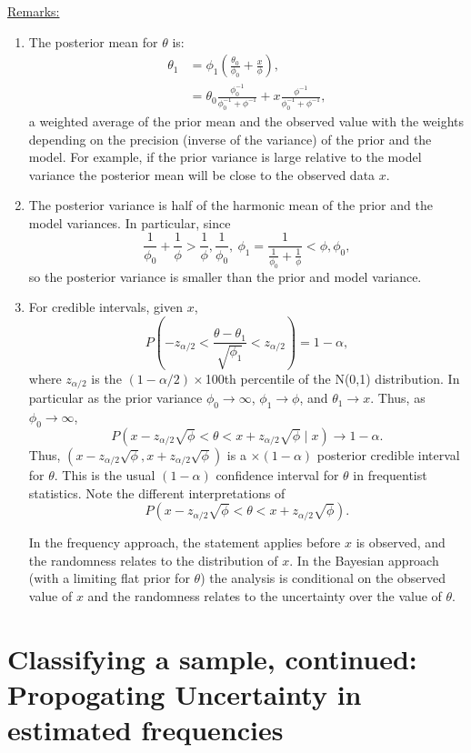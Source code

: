 \documentclass{article}[11pt]
\begin{document}
\underline{Remarks:}
\begin{enumerate}
\item The posterior mean for $\theta$ is:
\begin{align}
\theta_1 & =\phi_1 \left(\frac{\theta_0}{\phi_0} + \frac{x}{\phi}
\right), \\
&=\theta_0 \frac{\phi_0^{-1}}{\phi_0^{-1}+ \phi^{-1}} + x
\frac{\phi^{-1}}{\phi_0^{-1}+ \phi^{-1}},
\end{align}
a weighted average of the prior mean and the observed value with the
weights depending on the precision (inverse of the variance) of the
prior and the model.  For example, if the prior variance is large
relative to the model variance the posterior mean will be close to the
observed data $x$.
\item The posterior variance is half of the harmonic mean of the prior
  and the model variances.  In particular, since
$$\frac{1}{\phi_0}+\frac{1}{\phi} > \frac{1}{\phi}, \frac{1}{\phi_0},\
\phi_1=\frac{1}{\frac{1}{\phi_0}+\frac{1}{\phi}} < \phi, \phi_0,$$
so the posterior variance is smaller than the prior and model
variance.
\item For credible intervals, given $x$,
$$P\left( -z_{\alpha/2} < \frac{\theta - \theta_1}{\sqrt{\phi_1}} <
  z_{\alpha/2} \right) = 1-\alpha,$$
where $z_{\alpha/2}$ is the $(1-\alpha/2) \times$100th percentile of the
N(0,1) distribution.  In particular as the prior variance $\phi_0
\rightarrow \infty$, $\phi_1 \rightarrow \phi$, and $\theta_1
\rightarrow x$.  Thus, as $\phi_0 \rightarrow \infty$,
$$P\left( x-z_{\alpha/2} \sqrt{\phi} < \theta < x+
  z_{\alpha/2}\sqrt{\phi} \mid x \right) \rightarrow 1-\alpha.$$
Thus, $\left( x-z_{\alpha/2} \sqrt{\phi}, x+
  z_{\alpha/2}\sqrt{\phi} \right)$ is a $\times(1-\alpha)$
posterior credible interval for $\theta$.  This is the usual $(1-\alpha)$ confidence interval for $\theta$ in
frequentist statistics.  Note the different interpretations of
$$P\left( x-z_{\alpha/2} \sqrt{\phi} < \theta <
  x+z_{\alpha/2}\sqrt{\phi} \right).$$

In the frequency approach, the statement applies before $x$ is observed,
and the randomness relates to the distribution of $x$.  In the Bayesian
approach (with a limiting flat prior for $\theta$) the analysis is conditional
on the observed value of $x$ and the randomness relates to the
uncertainty over the value of $\theta$.

\end{enumerate}

\section{Classifying a sample, continued: Propogating Uncertainty in estimated frequencies}
\end{document}
